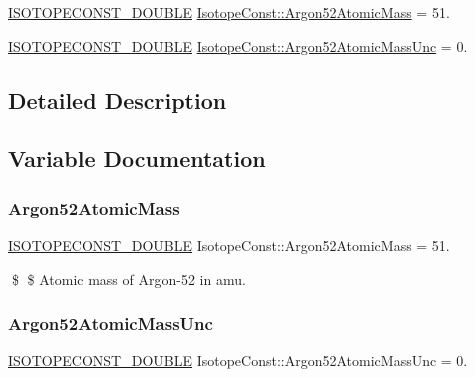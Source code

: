 \begin{DoxyCompactItemize}
\item 
\mbox{\hyperlink{group___isotope_const-_macros_ga8f45a7272ce02c0b4c65c44636ed719a}{I\+S\+O\+T\+O\+P\+E\+C\+O\+N\+S\+T\+\_\+\+D\+O\+U\+B\+LE}} \mbox{\hyperlink{group___isotope_const-_argon-_ar52_ga2ff43cfe749500dea46547f22534a58d}{Isotope\+Const\+::\+Argon52\+Atomic\+Mass}} = 51.
\item 
\mbox{\hyperlink{group___isotope_const-_macros_ga8f45a7272ce02c0b4c65c44636ed719a}{I\+S\+O\+T\+O\+P\+E\+C\+O\+N\+S\+T\+\_\+\+D\+O\+U\+B\+LE}} \mbox{\hyperlink{group___isotope_const-_argon-_ar52_ga1ac92bd2fe00a6bc011be292d837a02a}{Isotope\+Const\+::\+Argon52\+Atomic\+Mass\+Unc}} = 0.
\end{DoxyCompactItemize}


\subsection{Detailed Description}


\subsection{Variable Documentation}
\mbox{\label{group___isotope_const-_argon-_ar52_ga2ff43cfe749500dea46547f22534a58d}} 
\subsubsection{\texorpdfstring{Argon52\+Atomic\+Mass}{Argon52AtomicMass}}
{\footnotesize\ttfamily \mbox{\hyperlink{group___isotope_const-_macros_ga8f45a7272ce02c0b4c65c44636ed719a}{I\+S\+O\+T\+O\+P\+E\+C\+O\+N\+S\+T\+\_\+\+D\+O\+U\+B\+LE}} Isotope\+Const\+::\+Argon52\+Atomic\+Mass = 51.}

\$ \$ Atomic mass of Argon-\/52 in amu. \mbox{\label{group___isotope_const-_argon-_ar52_ga1ac92bd2fe00a6bc011be292d837a02a}} 
\subsubsection{\texorpdfstring{Argon52\+Atomic\+Mass\+Unc}{Argon52AtomicMassUnc}}
{\footnotesize\ttfamily \mbox{\hyperlink{group___isotope_const-_macros_ga8f45a7272ce02c0b4c65c44636ed719a}{I\+S\+O\+T\+O\+P\+E\+C\+O\+N\+S\+T\+\_\+\+D\+O\+U\+B\+LE}} Isotope\+Const\+::\+Argon52\+Atomic\+Mass\+Unc = 0.}

